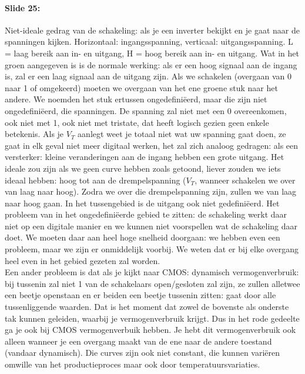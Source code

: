 \documentclass[10pt,a4paper]{book}
\begin{document}
\paragraph{Slide 25:} Niet-ideale gedrag van de schakeling: als je een inverter bekijkt en je gaat naar de spanningen kijken. Horizontaal: ingangsspanning, verticaal: uitgangsspanning. L = laag bereik aan in- en uitgang, H = hoog bereik aan in- en uitgang. Wat in het groen aangegeven is is de normale werking: als er een hoog signaal aan de ingang is, zal er een laag signaal aan de uitgang zijn. Als we schakelen (overgaan van 0 naar 1 of omgekeerd) moeten we overgaan van het ene groene stuk naar het andere. We noemden het stuk ertussen ongedefini\"eerd, maar die zijn niet ongedefini\"eerd, die spanningen. De spanning zal niet met een 0 overeenkomen, ook niet met 1, ook niet met tristate, dat heeft logisch gezien geen enkele betekenis. Als je $V_T$ aanlegt weet je totaal niet wat uw spanning gaat doen, ze gaat in elk geval niet meer digitaal werken, het zal zich analoog gedragen: als een versterker: kleine veranderingen aan de ingang hebben een grote uitgang. Het ideale zou zijn als we geen curve hebben zoals getoond, liever zouden we iets ideaal hebben: hoog tot aan de drempelspanning ($V_T$, wanneer schakelen we over van laag naar hoog). Zodra we over die drempelspanning zijn, zullen we van laag naar hoog gaan. In het tussengebied is de uitgang ook niet gedefini\"eerd. Het probleem van in het ongedefini\"eerde gebied te zitten: de schakeling werkt daar niet op een digitale manier en we kunnen niet voorspellen wat de schakeling daar doet. We moeten daar aan heel hoge snelheid doorgaan: we hebben even een probleem, maar we zijn er onmiddelijk voorbij. We weten dat er bij elke overgang heel even in het gebied gezeten zal worden.\\
Een ander probleem is dat als je kijkt naar CMOS: dynamisch vermogenverbruik: bij tussenin zal niet 1 van de schakelaars open/gesloten zal zijn, ze zullen alletwee een beetje openstaan en er beiden een beetje tussenin zitten: gaat door alle tussenliggende waarden. Dat is het moment dat zowel de bovenste als onderste tak kunnen geleiden, waarbij je vermogenverbruik krijgt.  Dus in het rode gedeelte ga je ook bij CMOS vermogenverbuik hebben. Je hebt dit vermogenverbruik ook alleen wanneer je een overgang maakt van de ene naar de andere toestand (vandaar dynamisch). Die curves zijn ook niet constant, die kunnen vari\"eren omwille van het productieproces maar ook door temperatuursvariaties. 
\end{document}
